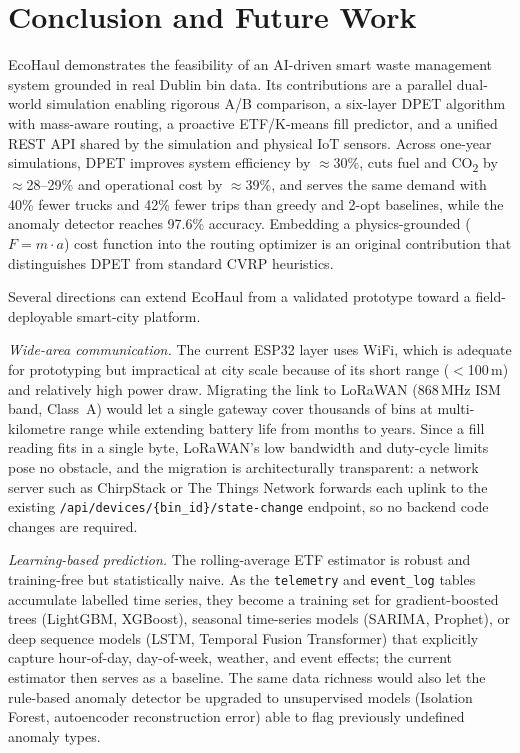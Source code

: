 \documentclass[conference, a4paper]{IEEEtran}
\begin{document}
\section{Conclusion and Future Work}
EcoHaul demonstrates the feasibility of an AI-driven smart waste management system grounded in real Dublin bin data. Its contributions are a parallel dual-world simulation enabling rigorous A/B comparison, a six-layer DPET algorithm with mass-aware routing, a proactive ETF/K-means fill predictor, and a unified REST API shared by the simulation and physical IoT sensors. Across one-year simulations, DPET improves system efficiency by $\approx$30\%, cuts fuel and CO\textsubscript{2} by $\approx$28--29\% and operational cost by $\approx$39\%, and serves the same demand with 40\% fewer trucks and 42\% fewer trips than greedy and 2-opt baselines, while the anomaly detector reaches 97.6\% accuracy. Embedding a physics-grounded ($F=m\cdot a$) cost function into the routing optimizer is an original contribution that distinguishes DPET from standard CVRP heuristics.

Several directions can extend EcoHaul from a validated prototype toward a field-deployable smart-city platform.

\textit{Wide-area communication.} The current ESP32 layer uses WiFi, which is adequate for prototyping but impractical at city scale because of its short range ($<$100\,m) and relatively high power draw. Migrating the link to LoRaWAN (868\,MHz ISM band, Class~A) would let a single gateway cover thousands of bins at multi-kilometre range while extending battery life from months to years. Since a fill reading fits in a single byte, LoRaWAN's low bandwidth and duty-cycle limits pose no obstacle, and the migration is architecturally transparent: a network server such as ChirpStack or The Things Network forwards each uplink to the existing \texttt{/api/devices/\{bin\_id\}/state-change} endpoint, so no backend code changes are required.

\textit{Learning-based prediction.} The rolling-average ETF estimator is robust and training-free but statistically naive. As the \texttt{telemetry} and \texttt{event\_log} tables accumulate labelled time series, they become a training set for gradient-boosted trees (LightGBM, XGBoost), seasonal time-series models (SARIMA, Prophet), or deep sequence models (LSTM, Temporal Fusion Transformer) that explicitly capture hour-of-day, day-of-week, weather, and event effects; the current estimator then serves as a baseline. The same data richness would also let the rule-based anomaly detector be upgraded to unsupervised models (Isolation Forest, autoencoder reconstruction error) able to flag previously undefined anomaly types.
\end{document}
